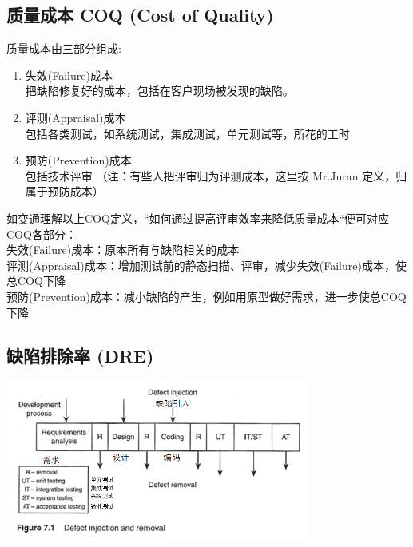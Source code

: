 \hypertarget{ux8d28ux91cfux6210ux672c-coq-cost-of-quality}{%
\subsection{质量成本 COQ (Cost of
Quality)}\label{ux8d28ux91cfux6210ux672c-coq-cost-of-quality}}

质量成本由三部分组成:

\begin{enumerate}
\tightlist
\item
  失效(Failure)成本\\
  把缺陷修复好的成本，包括在客户现场被发现的缺陷。
\item
  评测(Appraisal)成本\\
  包括各类测试，如系统测试，集成测试，单元测试等，所花的工时
\item
  预防(Prevention)成本\\
  包括技术评审 （注：有些人把评审归为评测成本，这里按 Mr.Juran
  定义，归属于预防成本）
\end{enumerate}

如变通理解以上COQ定义，``如何通过提高评审效率来降低质量成本``便可对应COQ各部分：\\
失效(Failure)成本：原本所有与缺陷相关的成本\\
评测(Appraisal)成本：增加测试前的静态扫描、评审，减少失效(Failure)成本，使总COQ下降\\
预防(Prevention)成本：减小缺陷的产生，例如用原型做好需求，进一步使总COQ下降\\

\hypertarget{ux7f3aux9677ux6392ux9664ux7387-dre}{%
\subsection{缺陷排除率 (DRE)}\label{ux7f3aux9677ux6392ux9664ux7387-dre}}


\includegraphics[width=10cm]{jaloteemm7110.png}

